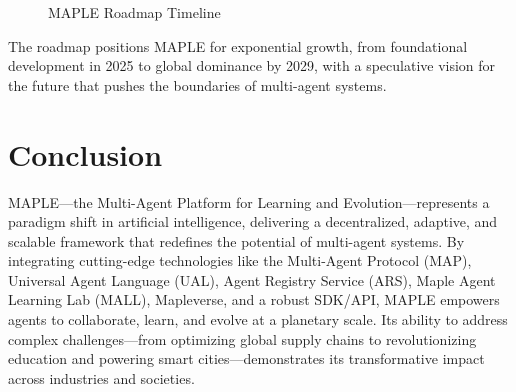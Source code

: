 \documentclass[a4paper,11pt]{article}
\begin{document}
\begin{figure}[!ht]
\centering
{}
\caption{MAPLE Roadmap Timeline}
\label{fig:roadmap}
\end{figure}
\vspace{0.5cm}

The roadmap positions MAPLE for exponential growth, from foundational development in 2025 to global dominance by 2029, with a speculative vision for the future that pushes the boundaries of multi-agent systems.

\pagebreak

\section{Conclusion}
MAPLE—the Multi-Agent Platform for Learning and Evolution—represents a paradigm shift in artificial intelligence, delivering a decentralized, adaptive, and scalable framework that redefines the potential of multi-agent systems. By integrating cutting-edge technologies like the Multi-Agent Protocol (MAP), Universal Agent Language (UAL), Agent Registry Service (ARS), Maple Agent Learning Lab (MALL), Mapleverse, and a robust SDK/API, MAPLE empowers agents to collaborate, learn, and evolve at a planetary scale. Its ability to address complex challenges—from optimizing global supply chains to revolutionizing education and powering smart cities—demonstrates its transformative impact across industries and societies.
\end{document}
